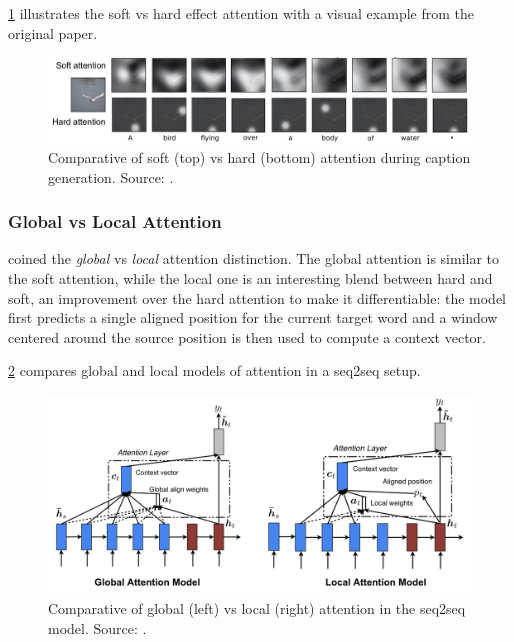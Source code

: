 \cref{fig:soft-vs-hard-attention} illustrates the soft vs hard effect attention with a visual example from the original paper.

\begin{figure}[hpt]
	\centering
	\includegraphics[scale=0.3]{images/ch3/soft-vs-hard-attention.png}
	\caption{Comparative of soft (top) vs hard (bottom) attention during caption generation. Source: \citep{Xu2015}.}
	\label{fig:soft-vs-hard-attention}
\end{figure}

\subsubsection{Global vs Local Attention}

\citet{Luong2015} coined the \textit{global} vs \textit{local} attention distinction. The global attention is similar to the soft attention, while the local one is an interesting blend between hard and soft, an improvement over the hard attention to make it differentiable: the model first predicts a single aligned position for the current target word and a window centered around the source position is then used to compute a context vector.

\cref{fig:global-vs-local-attention} compares global and local models of attention in a seq2seq setup.

\begin{figure}[hpt]
	\centering
	\includegraphics[scale=0.3]{images/ch3/global-vs-local-attention.png}
	\caption{Comparative of global (left) vs local (right) attention in the seq2seq model. Source: \citep{Luong2015}.}
	\label{fig:global-vs-local-attention}
\end{figure}

